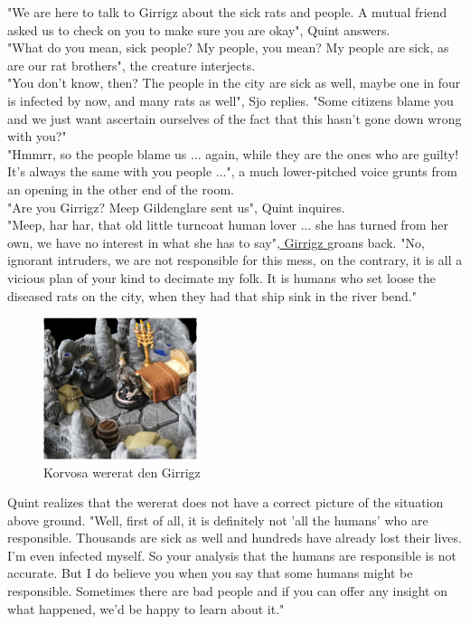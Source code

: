 "We are here to talk to Girrigz about the sick rats and people. A mutual friend asked us to check on you to make sure you are okay", Quint answers.\\

"What do you mean, sick people? My people, you mean? My people are sick, as are our rat brothers", the creature interjects.\\

"You don't know, then? The people in the city are sick as well, maybe one in four is infected by now, and many rats as well", Sjo replies. "Some citizens blame you and we just want ascertain ourselves of the fact that this hasn't gone down wrong with you?"\\

"Hmmrr, so the people blame us ... again, while they are the ones who are guilty! It's always the same with you people ...", a much lower-pitched voice grunts from an opening in the other end of the room.\\

"Are you Girrigz? Meep Gildenglare sent us", Quint inquires.\\

"Meep, har har, that old little turncoat human lover ... she has turned from her own, we have no interest in what she has to say",\hyperref[fig:Korvosa-wererat-den-Girrigz-503384054]{ Girrigz } groans back. "No, ignorant intruders, we are not responsible for this mess, on the contrary, it is all a vicious plan of your kind to decimate my folk. It is humans who set loose the diseased rats on the city, when they had that ship sink in the river bend." \\

\begin{figure}[h]
	\centering
	\includegraphics[width=0.4\textwidth]{images/Korvosa-wererat-den-Girrigz-503384054_mod.jpg}
	\caption{Korvosa wererat den Girrigz}
	\label{fig:Korvosa-wererat-den-Girrigz-503384054}
\end{figure}

Quint realizes that the wererat does not have a correct picture of the situation above ground. "Well, first of all, it is definitely not 'all the humans' who are responsible. Thousands are sick as well and hundreds have already lost their lives. I'm even infected myself. So your analysis that the humans are responsible is not accurate. But I do believe you when you say that some humans might be responsible. Sometimes there are bad people and if you can offer any insight on what happened, we'd be happy to learn about it."\\

